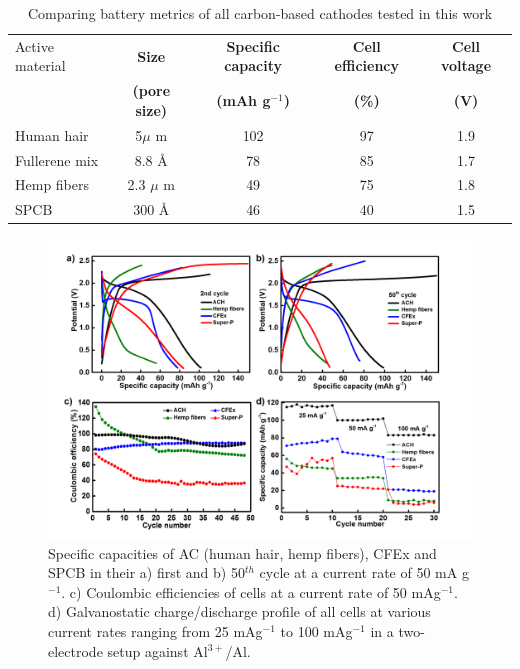 \begin{table}[h!]
\caption{Comparing battery metrics of all carbon-based cathodes tested in this work} \label{table1bm}
\begin{center}
\begin{tabular}{|lcccc|}
\hline
Active material & {\textbf{Size}} & {\textbf{Specific capacity}} & {\textbf{Cell efficiency}} & {\textbf{Cell voltage}}\\
 & {\textbf{(pore size)}} & {\textbf{(mAh g$^{-1}$)}} & {\textbf{(\%)}} & {\textbf{(V)}}\\
\hline
Human hair & 5${\mu}$ m & 102 & 97 & 1.9 \\
Fullerene mix & 8.8 \AA & 78 & 85 & 1.7 \\
Hemp fibers & 2.3 $\mu$ m & 49 & 75 & 1.8 \\
SPCB & 300 \AA & 46 & 40 & 1.5 \\
\hline  %
\end{tabular}
\end{center}
\end{table}

\begin{figure}[h!]
  \centering
  \includegraphics[width=\textwidth]{Figures/chap5fig/cdcall}
    \caption{Specific capacities of AC (human hair, hemp fibers), CFEx and SPCB in their a) first and b) 50$^{th}$ cycle at a current rate of 50 mA g$^{-1}$. c) Coulombic efficiencies of cells at a current rate of 50 mAg$^{-1}$. d) Galvanostatic charge/discharge profile of all cells at various current rates ranging from 25 mAg$^{-1}$ to 100 mAg$^{-1}$ in a two-electrode setup against Al$^{3+}$/Al.}
  \label{Figures/chap5fig:cdcall}
\end{figure}


